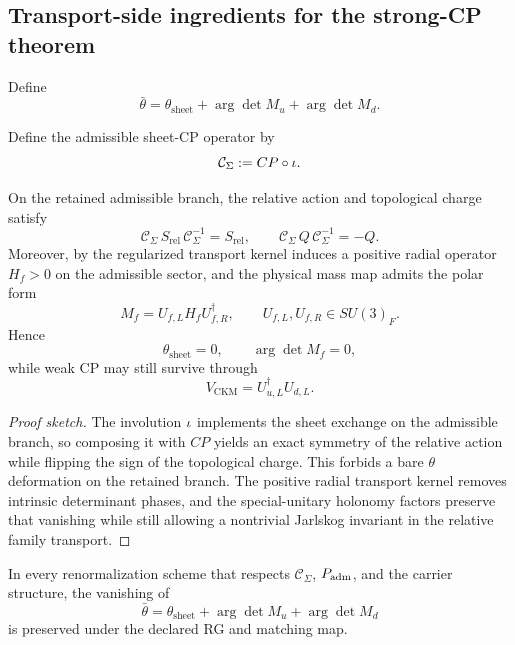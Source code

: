 \subsection{Transport-side ingredients for the strong-CP theorem}

Define
\begin{equation}
\label{eq:strong-cp}
\bar\theta=\theta_{\mathrm{sheet}}+\arg\det M_u+\arg\det M_d.
\end{equation}
\begin{definition}
\label{def:sheet-cp-symmetry}
Define the admissible sheet-CP operator by
\[
\mathcal C_\Sigma:=CP\circ\iota.
\]
\end{definition}

\begin{theorem}
\label{thm:sheet-cp-protection}
On the retained admissible branch, the relative action and topological charge satisfy
\[
\mathcal C_\Sigma\,S_{\mathrm{rel}}\,\mathcal C_\Sigma^{-1}=S_{\mathrm{rel}},
\qquad
\mathcal C_\Sigma\,Q\,\mathcal C_\Sigma^{-1}=-Q.
\]
Moreover, by  the regularized transport kernel induces a positive radial operator $H_f>0$ on the admissible sector, and the physical mass map admits the polar form
\[
M_f=U_{f,L}H_fU_{f,R}^\dagger,
\qquad
U_{f,L},U_{f,R}\in SU(3)_F.
\]
Hence
\[
\theta_{\mathrm{sheet}}=0,
\qquad
\arg\det M_f=0,
\]
while weak CP may still survive through
\[
V_{\mathrm{CKM}}=U_{u,L}^\dagger U_{d,L}.
\]
\end{theorem}

\begin{proof}[Proof sketch]
The involution $\iota$ implements the sheet exchange on the admissible branch, so composing it with $CP$ yields an exact symmetry of the relative action while flipping the sign of the topological charge. This forbids a bare $\theta$ deformation on the retained branch. The positive radial transport kernel removes intrinsic determinant phases, and the special-unitary holonomy factors preserve that vanishing while still allowing a nontrivial Jarlskog invariant in the relative family transport.
\end{proof}

\begin{corollary}[Symmetry-protected stability of $\bar\theta=0$ under admissible RG maps]
\label{cor:strong-cp-rg-stability}
In every renormalization scheme that respects $\mathcal C_\Sigma$, $P_{\mathrm{adm}}$, and the carrier structure, the vanishing of
\[
\bar\theta=\theta_{\mathrm{sheet}}+\arg\det M_u+\arg\det M_d
\]
is preserved under the declared RG and matching map.
\end{corollary}

